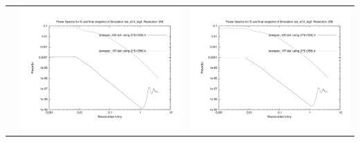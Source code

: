 \begin{itemize}
\begin{table}[p]
\begin{tabular}{l|c|c}
 & \includegraphics[scale=0.25]{r256/h70/red_st14_log2/plot_powspec_red_st14_log2.pdf} & \includegraphics[scale=0.25]{r256/h100/red_st14_log2/plot_powspec_red_st14_log2.pdf} \\

\end{tabular}
\end{table}
\end{itemize}
